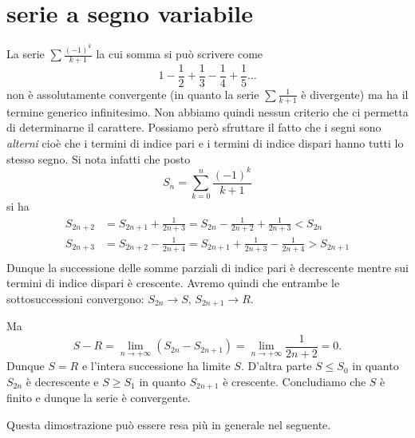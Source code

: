 \section{serie a segno variabile}

La serie $\sum \frac{(-1)^k}{k+1}$ la cui somma si può scrivere come
\[
1 - \frac{1}{2} + \frac{1}{3} - \frac{1}{4} +  \frac{1}{5} \dots
\]
non è assolutamente convergente
(in quanto la serie $\sum \frac 1 {k+1}$ è divergente) ma ha il termine generico
infinitesimo. Non abbiamo quindi nessun criterio che ci permetta di
determinarne il carattere.
Possiamo però sfruttare il fatto che i segni sono \emph{alterni} cioè
che i termini di indice pari e i termini di indice dispari hanno tutti
lo stesso segno. Si nota infatti che posto
\[
  S_n = \sum_{k=0}^n \frac{(-1)^k}{k+1}
\]
si ha
\begin{align*}
S_{2n+2}
  &= S_{2n+1} + \frac{1}{2n+3}
  = S_{2n} - \frac{1}{2n+2} + \frac{1}{2n+3}
  < S_{2n}\\
S_{2n+3}
  &= S_{2n+2} - \frac{1}{2n+4}
  = S_{2n+1} + \frac{1}{2n+3} - \frac{1}{2n+4}
  > S_{2n+1} \\
\end{align*}
Dunque la successione delle somme parziali di indice pari è decrescente mentre
sui termini di indice dispari è crescente. Avremo quindi che entrambe
le sottosuccessioni convergono: $S_{2n} \to S$, $S_{2n+1} \to R$.

Ma
\[
  S - R = \lim_{n\to +\infty} (S_{2n} - S_{2n+1}) = \lim_{n\to+\infty}\frac{1}{2n+2} = 0.
\]
Dunque $S=R$ e l'intera successione ha limite $S$. D'altra parte $S \le S_0$ in quanto $S_{2n}$ è decrescente e $S\ge S_1$ in quanto $S_{2n+1}$ è crescente. Concludiamo che $S$ è finito e dunque la serie è convergente.

Questa dimostrazione può essere resa più in generale nel seguente.

